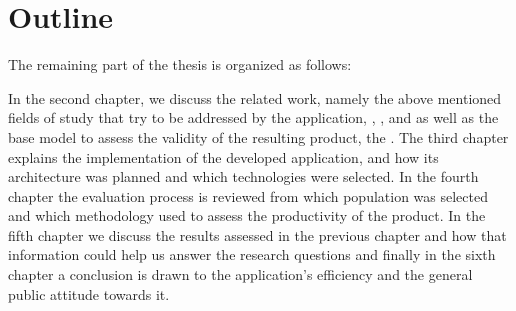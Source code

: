 \section{Outline}
The remaining part of the thesis is organized as follows:

In the second chapter, we discuss the related work, namely the above mentioned fields of study 
that try to be addressed by the application, , ,  and  as well as the base model to assess the validity of the 
resulting product, the .
The third chapter explains the implementation of the developed application, and how its architecture
was planned and which technologies were selected.
In the fourth chapter the evaluation process is reviewed from which population was selected and which
methodology used to assess the productivity of the product.
In the fifth chapter we discuss the results assessed in the previous chapter and how that information
could help us answer the research questions and finally in the sixth chapter a conclusion is drawn
to the application's efficiency and the general public attitude towards it.
